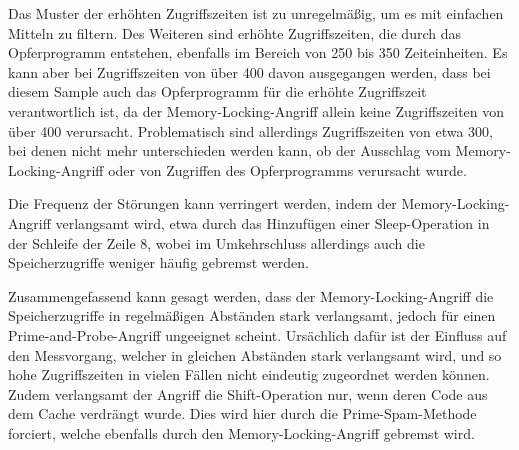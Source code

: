 Das Muster der erhöhten Zugriffszeiten ist zu unregelmäßig, um es mit einfachen Mitteln zu filtern.
Des Weiteren sind erhöhte Zugriffszeiten, die durch das Opferprogramm entstehen, ebenfalls im Bereich von 250 bis 350 Zeiteinheiten.
Es kann aber bei Zugriffszeiten von über 400 davon ausgegangen werden, dass bei diesem Sample auch das Opferprogramm für die erhöhte Zugriffszeit verantwortlich ist, da der Memory-Locking-Angriff allein keine Zugriffszeiten von über 400 verursacht.
Problematisch sind allerdings Zugriffszeiten von etwa 300, bei denen nicht mehr unterschieden werden kann, ob der Ausschlag vom Memory-Locking-Angriff oder von Zugriffen des Opferprogramms verursacht wurde.

Die Frequenz der Störungen kann verringert werden, indem der Memory-Locking-Angriff verlangsamt wird, etwa durch das Hinzufügen einer Sleep-Operation in der Schleife der Zeile 8, wobei im Umkehrschluss allerdings auch die Speicherzugriffe weniger häufig gebremst werden.

Zusammengefassend kann gesagt werden, dass der Memory-Locking-Angriff die Speicherzugriffe in regelmäßigen Abständen stark verlangsamt, jedoch für einen Prime-and-Probe-Angriff ungeeignet scheint.
Ursächlich dafür ist der Einfluss auf den Messvorgang, welcher in gleichen Abständen stark verlangsamt wird, und so hohe Zugriffszeiten in vielen Fällen nicht eindeutig zugeordnet werden können.
Zudem verlangsamt der Angriff die Shift-Operation nur, wenn deren Code aus dem Cache verdrängt wurde.
Dies wird hier durch die Prime-Spam-Methode forciert, welche ebenfalls durch den Memory-Locking-Angriff gebremst wird.







